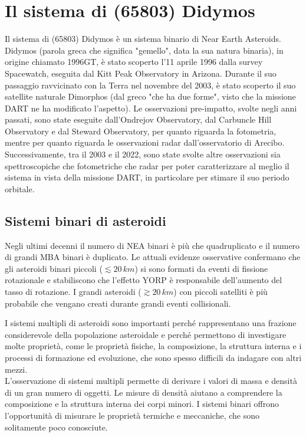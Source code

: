 \documentclass[a4paper,11pt,openright]{book}
\begin{document}
\chapter{Il sistema di (65803) Didymos}\label{ch:ch_4}
Il sistema di (65803) Didymos è un sistema binario di Near Earth Asteroids.\\
Didymos (parola greca che significa "gemello", data la sua natura binaria), in origine chiamato 1996GT, è stato scoperto l'11 aprile 1996 dalla survey Spacewatch, eseguita dal Kitt Peak Observatory in Arizona. Durante il suo passaggio ravvicinato con la Terra nel novembre del 2003, è stato scoperto il suo satellite naturale Dimorphos (dal greco "che ha due forme", visto che la missione DART ne ha modificato l'aspetto). Le osservazioni pre-impatto, svolte negli anni passati, sono state eseguite dall'Ondrejov Observatory, dal Carbuncle Hill Observatory e dal Steward Observatory, per quanto riguarda la fotometria, mentre per quanto riguarda le osservazioni radar dall'osservatorio di Arecibo.\\
Successivamente, tra il 2003 e il 2022, sono state svolte altre osservazioni sia spettroscopiche che fotometriche che radar per poter caratterizzare al meglio il sistema in vista della missione DART, in particolare per stimare il suo periodo orbitale.

\section{Sistemi binari di asteroidi}\label{sec:binary_system}
Negli ultimi decenni il numero di NEA binari è più che quadruplicato e il numero di grandi MBA binari è duplicato. Le attuali evidenze osservative confermano che gli asteroidi binari piccoli ($\lesssim 20\,km$) si sono formati da eventi di fissione rotazionale e stabiliscono che l'effetto YORP è responsabile dell'aumento del tasso di rotazione. I grandi asteroidi ($\gtrsim20\,km$) con piccoli satelliti è più probabile che vengano creati durante grandi eventi collisionali.

I sistemi multipli di asteroidi sono importanti perché rappresentano una frazione considerevole della popolazione asteroidale e perché permettono di investigare molte proprietà, come le proprietà fisiche, la composizione, la struttura interna e i processi di formazione ed evoluzione, che sono spesso difficili da indagare con altri mezzi.\\
L'osservazione di sistemi multipli permette di derivare i valori di massa e densità di un gran numero di oggetti. Le misure di densità aiutano a comprendere la composizione e la struttura interna dei corpi minori. I sistemi binari offrono l'opportunità di misurare le proprietà termiche e meccaniche, che sono solitamente poco conosciute.
\end{document}
